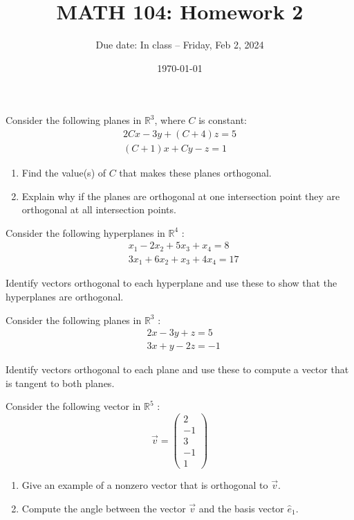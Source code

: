 \documentclass[12pt]{amsart}
\title{ MATH 104: Homework 2}
\author{Due date: In class -- Friday, Feb 2, 2024}
\date{\today}
\begin{document}
\maketitle

\begin{problem}
 Consider the following planes in $\mathbb{R}^3$, where $C$ is constant:
$$
\begin{gathered}
2 C x-3 y+(C+4) z=5 \\
(C+1) x+C y-z=1
\end{gathered}
$$
\begin{enumerate}
    \item  Find the value(s) of $C$ that makes these planes orthogonal.
    \item  Explain why if the planes are orthogonal at one intersection point they are orthogonal at all intersection points.
\end{enumerate}
\end{problem}

\begin{problem}
Consider the following hyperplanes in $\mathbb{R}^4$ :
$$
\begin{aligned}
& x_1-2 x_2+5 x_3+x_4=8 \\
& 3 x_1+6 x_2+x_3+4 x_4=17
\end{aligned}
$$

Identify vectors orthogonal to each hyperplane and use these to show that the hyperplanes are orthogonal.
\end{problem}

\begin{problem}
Consider the following planes in $\mathbb{R}^3$ :
$$
\begin{aligned}
& 2 x-3 y+z=5 \\
& 3 x+y-2 z=-1
\end{aligned}
$$

Identify vectors orthogonal to each plane and use these to compute a vector that is tangent to both planes.
\end{problem}


\begin{problem}
Consider the following vector in $\mathbb{R}^5$ :
$$
\vec{v}=\left(\begin{array}{c}
2 \\
-1 \\
3 \\
-1 \\
1
\end{array}\right)
$$
\begin{enumerate}
    \item Give an example of a nonzero vector that is orthogonal to $\vec{v}$.
    \item  Compute the angle between the vector $\vec{v}$ and the basis vector $\hat{e}_1$.
\end{enumerate}
\end{problem}
\end{document}
